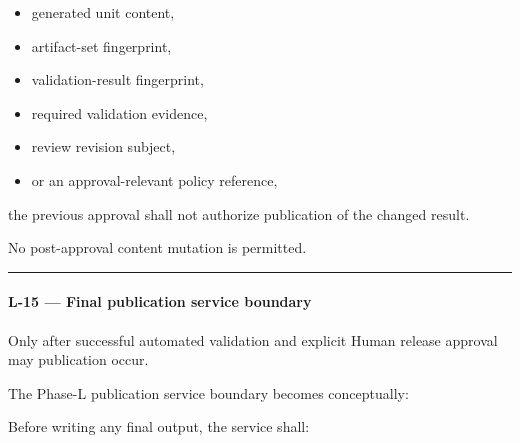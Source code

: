 \begin{itemize}
\tightlist
\item
  generated unit content,
\item
  artifact-set fingerprint,
\item
  validation-result fingerprint,
\item
  required validation evidence,
\item
  review revision subject,
\item
  or an approval-relevant policy reference,
\end{itemize}

the previous approval shall not authorize publication of the changed result.

No post-approval content mutation is permitted.

\begin{center}\rule{0.5\linewidth}{0.5pt}\end{center}

\hypertarget{l-15--final-publication-service-boundary}{%
\paragraph{L-15 --- Final publication service boundary}\label{l-15--final-publication-service-boundary}}

Only after successful automated validation and explicit Human release approval may publication occur.

The Phase-L publication service boundary becomes conceptually:

\begin{Shaded}
\begin{Highlighting}[]
\NormalTok{) }\OperatorTok{{-}\textgreater{}}
\end{Highlighting}
\end{Shaded}

Before writing any final output, the service shall:


